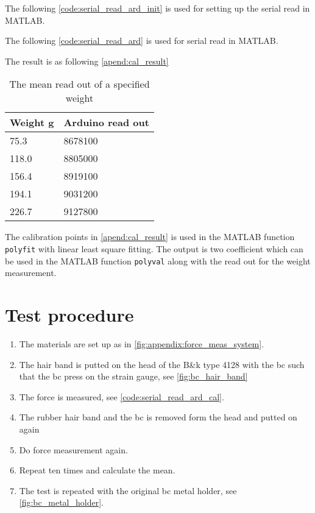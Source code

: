The following \autoref{code:serial_read_ard_init} is used for setting up the serial read in MATLAB.


The following \autoref{code:serial_read_ard} is used for serial read in MATLAB.


The result is as following \autoref{apend:cal_result}

\begin{table}[H]
\centering
\caption{The mean read out of a specified weight}
\label{apend:cal_result}
\begin{tabular}{l|l}
Weight \si{\gram} & Arduino read out \\ \hline
75.3              & 8678100          \\
118.0             & 8805000          \\
156.4             & 8919100          \\
194.1             & 9031200          \\
226.7             & 9127800         
\end{tabular}
\end{table}

The calibration points in \autoref{apend:cal_result} is used in the MATLAB function \texttt{polyfit} with linear least square fitting. The output is two coefficient which can be used in the MATLAB function \texttt{polyval} along with the read out for the weight measurement. 


\section*{Test procedure}


\begin{enumerate}
\item The materials are set up as in \autoref{fig:appendix:force_meas_system}.
\item The hair band is putted on the head of the B\&k type 4128 with the \gls{bc} such that the \gls{bc} press on the strain gauge, see \autoref{fig:bc_hair_band}
\item The force is measured, see \autoref{code:serial_read_ard_cal}.
\item The rubber hair band and the \gls{bc} is removed form the head and putted on again
\item Do force measurement again.
\item  Repeat ten times and calculate the mean.
\item  The test is repeated with the original \gls{bc} metal holder, see \autoref{fig:bc_metal_holder}.
\end{enumerate}




